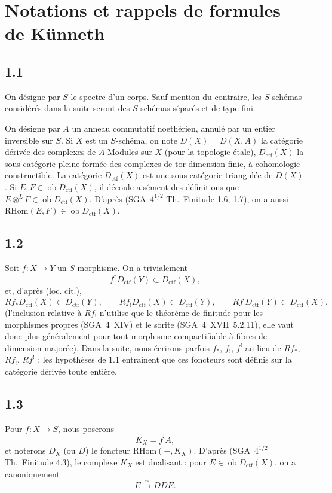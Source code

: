 \documentclass[11pt]{article}
\newcommand{\ob}{\operatorname{ob}}
\providecommand{\RHom}{\mathrm{RHom}}
\providecommand{\uRHom}{\underline{\RHom}}
\providecommand{\ctf}{\mathrm{ctf}}
\providecommand{\RHom}{\mathrm{RHom}}
\providecommand{\ob}{\operatorname{ob}}
\providecommand{\RHom}{\mathrm R\mathcal{H}om}
\providecommand{\RHom}{\mathrm{RHom}}
\begin{document}
\section{Notations et rappels de formules de Künneth}

\subsection*{1.1}
On désigne par $S$ le spectre d'un corps. Sauf mention du contraire, les $S$-schémas considérés dans la suite seront des $S$-schémas séparés et de type fini.

On désigne par $A$ un anneau commutatif noethérien, annulé par un entier inversible sur $S$. Si $X$ est un $S$-schéma, on note $D(X)=D(X,A)$ la catégorie dérivée des complexes de $A$-Modules sur $X$ (pour la topologie étale), $D_{\ctf}(X)$ la sous-catégorie pleine formée des complexes de tor-dimension finie, à cohomologie constructible. La catégorie $D_{\ctf}(X)$ est une sous-catégorie triangulée de $D(X)$. Si $E,F \in \ob D_{\ctf}(X)$, il découle aisément des définitions que $E \otimes^{L} F \in \ob D_{\ctf}(X)$. D'après (SGA~$4^{1/2}$ Th.~Finitude 1.6, 1.7), on a aussi $\uRHom(E,F) \in \ob D_{\ctf}(X)$.

\subsection*{1.2}
Soit $f:X\to Y$ un $S$-morphisme. On a trivialement
\[
f^{*}D_{\ctf}(Y) \subset D_{\ctf}(X),
\]
et, d'après (loc. cit.),
\[
Rf_{*}D_{\ctf}(X) \subset D_{\ctf}(Y),\qquad
Rf_{!}D_{\ctf}(X) \subset D_{\ctf}(Y),\qquad
Rf^{!}D_{\ctf}(Y) \subset D_{\ctf}(X),
\]
(l'inclusion relative à $Rf_{!}$ n'utilise que le théorème de finitude pour les morphismes propres (SGA~4~XIV) et le sorite (SGA~4~XVII~5.2.11), elle vaut donc plus généralement pour tout morphisme compactifiable à fibres de dimension majorée). Dans la suite, nous écrirons parfois $f_{*}$, $f_{!}$, $f^{!}$ au lieu de $Rf_{*}$, $Rf_{!}$, $Rf^{!}$ ; les hypothèses de 1.1 entraînent que ces foncteurs sont définis sur la catégorie dérivée toute entière.

\subsection*{1.3}
Pour $f:X\to S$, nous poserons
\[
K_X=f^{!}A,
\]
et noterons $D_X$ (ou $D$) le foncteur $\uRHom(-,K_X)$. D'après (SGA~$4^{1/2}$ Th.~Finitude 4.3), le complexe $K_X$ est dualisant : pour $E\in\ob D_{\ctf}(X)$, on a canoniquement
\[
E \xrightarrow{\sim} DDE.
\]
\end{document}
